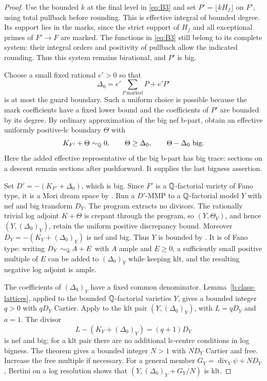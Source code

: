 \begin{proof}
Use the bounded \(k\) at the final level in \eqref{eq:B3} and set
\(P'=\lfloor kH_f\rfloor\) on \(F'\), using total pullback before
rounding. This is effective integral of bounded degree. Its support lies
in the marks, since the strict support of \(H_f\) and all exceptional
primes of \(F'\to F\) are marked. The functions in \eqref{eq:B3} still
belong to its complete system: their integral orders and positivity of
pullback allow the indicated rounding. Thus this system remains
birational, and \(P'\) is big.

Choose a small fixed rational \(e'>0\) so that
\[
 \Delta_0=e'\sum_{P\ \mathrm{marked}}P+e'P'
\]
is at most the guard boundary. Such a uniform choice is possible because
the mark coefficients have a fixed lower bound and the coefficients of
\(P'\) are bounded by its degree. By ordinary approximation of the big
nef b-part, obtain an effective uniformly positive-lc boundary \(\Theta\)
with
\[
 K_{F'}+\Theta\sim_{\mathbb Q}0,\qquad \Theta\geq\Delta_0,
 \qquad \Theta-\Delta_0\ \text{big}.
\]
Here the added effective representative of the big b-part has big trace:
sections on a descent remain sections after pushforward. It supplies the
last bigness assertion.

Set \(D'=-(K_{F'}+\Delta_0)\), which is big. Since \(F'\) is a
\(\mathbb Q\)-factorial variety of Fano type, it is a Mori dream space by
\cite[Corollary~1.3.1]{BCHM}.
Run a \(D'\)-MMP to a \(\mathbb Q\)-factorial model \(Y\) with nef and big
transform \(D_Y\). The program extracts no divisors. The rationally
trivial log adjoint \(K+\Theta\) is crepant through the program, so
\((Y,\Theta_Y)\), and hence \((Y,(\Delta_0)_Y)\), retain the uniform
positive discrepancy bound. Moreover
\(D_Y=-(K_Y+(\Delta_0)_Y)\) is nef and big. Thus \(Y\) is bounded by
\cite[Theorem~1.1]{BirkarBAB}. It is of Fano type: writing
\(D_Y\sim_{\mathbb Q}A+E\) with \(A\) ample and \(E\geq0\), a sufficiently
small positive multiple of \(E\) can be added to \((\Delta_0)_Y\) while
keeping klt, and the resulting negative log adjoint is ample.

The coefficients of \((\Delta_0)_Y\) have a fixed common denominator.
Lemma~\ref{b:class-lattices}, applied to the bounded \(\mathbb Q\)-factorial
varieties \(Y\), gives a bounded integer \(q>0\) with \(qD_Y\) Cartier.
Apply \cite[Theorem~1.1 and Remark~1.2]{FujinoBPF} to the klt pair
\((Y,(\Delta_0)_Y)\), with \(L=qD_Y\) and \(a=1\). The divisor
\[
 L-(K_Y+(\Delta_0)_Y)=(q+1)D_Y
\]
is nef and big; for a klt pair there are no additional lc-centre
conditions in log bigness. The theorem gives a bounded integer \(N>1\)
with \(ND_Y\) Cartier and free. Increase the free multiple if necessary.
For a general member
\(G_Y=\operatorname{div}_Y\psi+ND_Y\), Bertini on a log resolution
shows that
\((Y,(\Delta_0)_Y+G_Y/N)\) is klt.


\end{proof}

